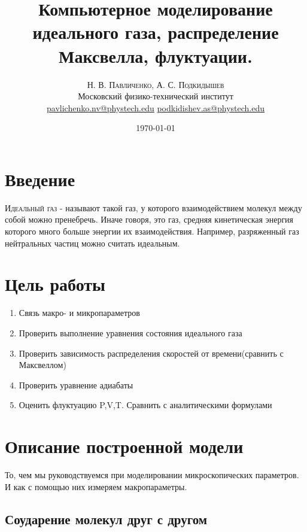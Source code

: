 \documentclass[twoside,twocolumn]{article}
\title{Компьютерное моделирование идеального газа, распределение Максвелла, флуктуации.} %
\author{%
\textsc{Н. В. Павличенко, А. С. Подкидышев} \\[1ex] %
\normalsize Московский физико-технический институт \\ %
\normalsize \href{mailto:pavlichenko.nv@phystech.edu}{pavlichenko.nv@phystech.edu}
\href{mailto:pavlichenko.nv@phystech.edu}{podkidishev.as@phystech.edu}%
}
\date{\today} %
\theoremstyle{plain}
\theoremstyle{definition}
\begin{document}
\maketitle

\section{Введение}

\lettrine[nindent=0em,lines=3]{И} {деальный газ} - называют такой газ, у которого взаимодействием молекул между собой можно пренебречь. Иначе говоря, это газ,
средняя кинетическая энергия которого много больше энергии их взаимодействия. Например, разряженный газ нейтральных частиц можно считать идеальным.

\section{Цель работы}
\begin{enumerate}
\item Связь макро- и микропараметров
\item Проверить выполнение уравнения состояния идеального газа
\item Проверить зависимость распределения скоростей от времени(сравнить с Максвеллом)
\item Проверить уравнение адиабаты
\item Оценить флуктуацию P,V,T. Сравнить с аналитическими формулами
\end{enumerate}

\section{Описание построенной модели}

\indent То, чем мы руководствуемся при моделировании микроскопических параметров. И как с помощью них измеряем макропараметры.

\subsection{Соударение молекул друг с другом}
\end{document}
